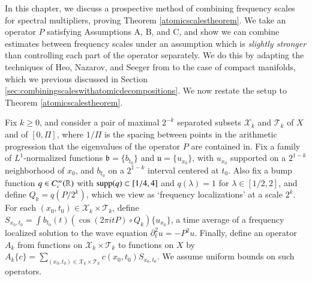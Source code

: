 
In this chapter, we discuss a prospective method of combining frequency scales for spectral multipliers, proving Theorem \ref{atomicscalestheorem}. We take an operator $P$ satisfying Assumptions A, B, and C, and show we can combine estimates between frequency scales under an assumption which is \emph{slightly stronger} than controlling each part of the operator separately. We do this by adapting the techniques of Heo, Nazarov, and Seeger from \cite{HeoandNazarovandSeeger2} to the case of compact manifolds, which we previous discussed in Section \ref{sec:combiningscaleswithatomicdecompositions}. We now restate the setup to Theorem \ref{atomicscalestheorem}.
    
Fix $k \geq 0$, and consider a pair of maximal $2^{-k}$ separated subsets $\mathcal{X}_k$ and $\mathcal{T}_k$ of $X$ and of $[0,\Pi]$, where $1/\Pi$ is the spacing between points in the arithmetic progression that the eigenvalues of the operator $P$ are contained in. Fix a family of $L^1$-normalized functions $\mathfrak{b} = \{ b_{t_0} \}$ and $\mathfrak{u} = \{ u_{x_0} \}$, with $u_{x_0}$ supported on a $2^{1-k}$ neighborhood of $x_0$, and $b_{t_0}$ on a $2^{1-k}$ interval centered at $t_0$. Also fix a bump function $q \in C_c^\infty(\operatorname{\mathbb{R}})$ with $\operatorname{\text{supp}}(q) \subset [1/4,4]$ and $q(\lambda) = 1$ for $\lambda \in [1/2,2]$, and define $Q_k = q(P/2^k)$, which we view as `frequency localizations' at a scale $2^k$. For each $(x_0,t_0) \in \mathcal{X}_k \times \mathcal{T}_k$, define $S\!_{x_0,t_0} = \int b_{t_0}(t) (\cos(2 \pi i t P) \circ Q_k) \{ u_{x_0} \}$, a time average of a frequency localized solution to the wave equation $\partial_t^2 u = - P^2 u$. Finally, define an operator $A_k$ from functions on $\mathcal{X}_k \times \mathcal{T}_k$ to functions on $X$ by $A_k \{ c \} = \sum\nolimits_{(x_0,t_0) \in \mathcal{X}_k \times \mathcal{T}_k} c(x_0,t_0) S\!_{x_0,t_0}$. We assume uniform bounds on such operators.

\vspace{0.5em}

\noindent {}
\vspace{0.4em}

